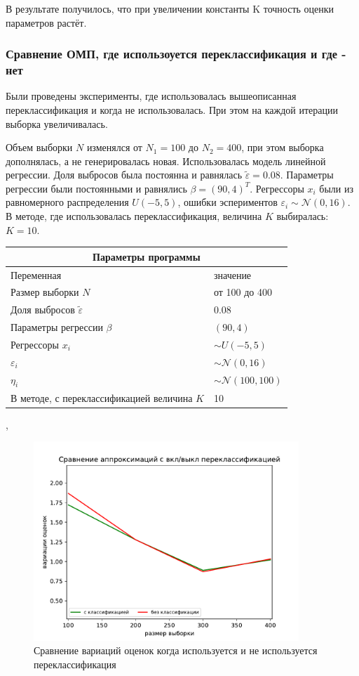 В результате получилось, что при увеличении константы K точность оценки параметров растёт. 
\subsubsection{Сравнение ОМП, где использоуется переклассификация и где - нет}
Были проведены эксперименты, где использовалась вышеописанная переклассификация и когда не использовалась. При этом на каждой итерации выборка увеличивалась. 

Объем выборки $N$ изменялся от $N_1=100$ до $N_2=400$, при этом выборка дополнялась, а не генерировалась новая. Использовалась модель линейной регрессии. Доля выбросов была постоянна и равнялась $\widetilde{\varepsilon}=0.08$. Параметры регрессии были постоянными и равнялись $\beta=(90,4)^T$. 
Регрессоры $x_i$ были из равномерного распределения $U(-5,5)$, ошибки эспериментов $\varepsilon_i\sim \mathcal{N}(0,16)$. В методе, где использовалась переклассификация, величина $K$ выбиралась: $K=10$.
\vspace{3cm}
\begin{center}
    \label{tab1}
    \begin{tabular}{|p{5cm}|p{5cm}|}
        \hline
        \multicolumn{2}{|c|}{Параметры программы} \\
        \hline
        Переменная&значение\\
        \hline
        Размер выборки $N$& от 100 до 400\\
        \hline
        Доля выбросов $\widetilde{\varepsilon}$& 0.08\\
        \hline
        Параметры регрессии $\beta$& $(90,4)$\\
        \hline
        Регрессоры $x_i$ & $\sim U(-5,5)$\\
        \hline
        $\varepsilon_i$&$\sim \mathcal{N}(0,16)$\\
        \hline
        $\eta_i$&$\sim \mathcal{N}(100,100)$\\
        \hline
        В методе, с переклассификацией величина $K$& 10\\
        \hline
    \end{tabular},
\end{center}
\newpage
\begin{figure}[ht!]
    \centering
    \includegraphics[width=100mm]{../images/on_off_recl.pdf}
    \caption{Сравнение вариаций оценок когда используется и не используется переклассификация\label{overflow}}
    \label{pic2}
\end{figure}

\newpage
